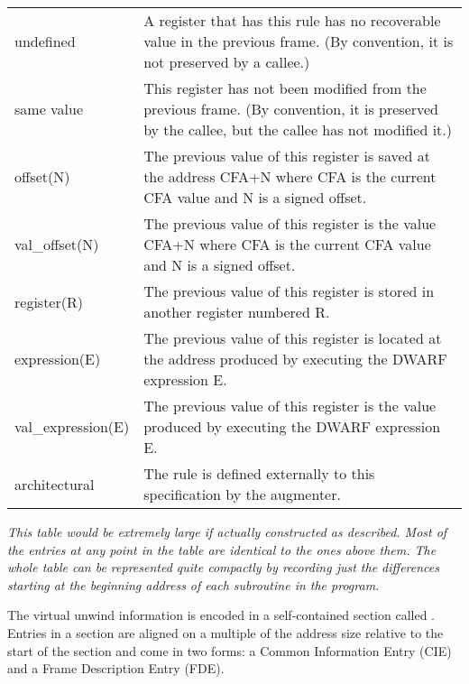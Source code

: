 \begin{tabular}{lp{8cm}}
undefined 
&A register that has this rule has no recoverable value in the previous frame.
(By convention, it is not preserved by a callee.) \\

same value
&This register has not been modified from the previous frame. (By convention,
it is preserved by the callee, but the callee has not modified it.) \\

offset(N)
&The previous value of this register is saved at the address CFA+N where CFA
is the current CFA value and N is a signed offset.\\

val\_offset(N)
&The previous value of this register is the value CFA+N where CFA is the
current CFA value and N is a signed offset.\\

register(R)
&The previous value of this register is stored 
in another register numbered R.\\

expression(E)
&The previous value of this register is located at the address produced by
executing the DWARF expression E.\\

val\_expression(E) 
&The previous value of this register is the value produced by executing the
DWARF expression E.\\

architectural
&The rule is defined externally to this specification by the augmenter.\\

\end{tabular}

\textit{This table would be extremely large if actually constructed
as described. Most of the entries at any point in the table
are identical to the ones above them. The whole table can be
represented quite compactly by recording just the differences
starting at the beginning address of each subroutine in
the program.}

The virtual unwind information is encoded in a self-contained
section called 
.  Entries in a 
 section
are aligned on a multiple of the address size relative to
the start of the section and come in two forms: a Common
Information Entry (CIE) and a 
Frame Description Entry (FDE).

